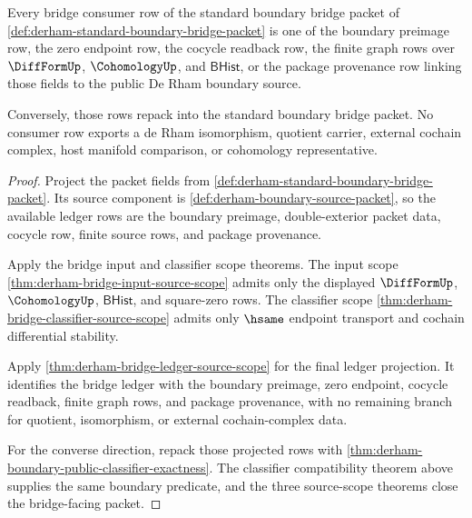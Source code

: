 \begin{theorem}
\label{thm:derham-bridge-consumer-ledger-exhaustion}
Every bridge consumer row of the standard boundary bridge packet of
\autoref{def:derham-standard-boundary-bridge-packet} is one of the boundary
preimage row, the zero endpoint row, the cocycle readback row, the finite graph
rows over $\DiffFormUp$, $\CohomologyUp$, and $\mathsf{BHist}$, or the package
provenance row linking those fields to the public De Rham boundary source.

Conversely, those rows repack into the standard boundary bridge packet. No
consumer row exports a de Rham isomorphism, quotient carrier, external cochain
complex, host manifold comparison, or cohomology representative.
\end{theorem}
\begin{proof}
Project the packet fields from
\autoref{def:derham-standard-boundary-bridge-packet}. Its source component is
\autoref{def:derham-boundary-source-packet}, so the available ledger rows are
the boundary preimage, double-exterior packet data, cocycle row, finite source
rows, and package provenance.

Apply the bridge input and classifier scope theorems. The input scope
\autoref{thm:derham-bridge-input-source-scope} admits only the displayed
$\DiffFormUp$, $\CohomologyUp$, $\mathsf{BHist}$, and square-zero rows. The
classifier scope \autoref{thm:derham-bridge-classifier-source-scope} admits
only $\hsame$ endpoint transport and cochain differential stability.

Apply \autoref{thm:derham-bridge-ledger-source-scope} for the final ledger
projection. It identifies the bridge ledger with the boundary preimage, zero
endpoint, cocycle readback, finite graph rows, and package provenance, with no
remaining branch for quotient, isomorphism, or external cochain-complex data.

For the converse direction, repack those projected rows with
\autoref{thm:derham-boundary-public-classifier-exactness}. The classifier
compatibility theorem above supplies the same boundary predicate, and the
three source-scope theorems close the bridge-facing packet.
\end{proof}

